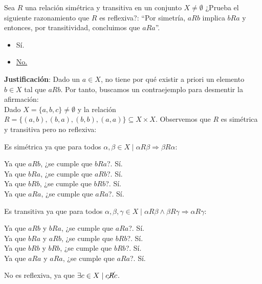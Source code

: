 \begin{ejercicio}
    Sea $R$ una relación simétrica y transitiva en un conjunto $X \neq \emptyset$ ¿Prueba el siguiente razonamiento que $R$ es reflexiva?:\newline
    ``Por simetría, $aRb$ implica $bRa$ y entonces, por transitividad, concluimos que $aRa$''.
    \begin{itemize}
        \item Sí.
        \item \underline{No.}
    \end{itemize}

    \noindent
    \textbf{Justificación}:
    Dado un $a \in X$, no tiene por qué existir a priori un elemento $b \in X$ tal que $aRb$. Por tanto, buscamos un contraejemplo para desmentir la afirmación:\\

    \noindent
    Dado $X = \{ a,b,c \} \neq \emptyset$ y la relación $R = \{ (a,b), (b,a), (b,b),(a,a) \} \subseteq X \times X$. \newline Observemos que $R$ es simétrica y transitiva pero no reflexiva:

    \noindent
    Es simétrica ya que para todos $\alpha, \beta \in X \mid \alpha R \beta \Rightarrow \beta R \alpha$:
    \begin{center}
        Ya que $aRb$, ¿se cumple que $bRa$?. Sí.\\
        Ya que $bRa$, ¿se cumple que $aRb$?. Sí.\\
        Ya que $bRb$, ¿se cumple que $bRb$?. Sí.\\
        Ya que $aRa$, ¿se cumple que $aRa$?. Sí.
    \end{center}
    Es transitiva ya que para todos $\alpha, \beta, \gamma \in X \mid \alpha R \beta \land \beta R \gamma \Rightarrow \alpha R \gamma$:
    \begin{center}
        Ya que $aRb$ y $bRa$, ¿se cumple que $aRa$?. Sí.\\
        Ya que $bRa$ y $aRb$, ¿se cumple que $bRb$?. Sí.\\
        Ya que $bRb$ y $bRb$, ¿se cumple que $bRb$?. Sí.\\
        Ya que $aRa$ y $aRa$, ¿se cumple que $aRa$?. Sí.
    \end{center}
    No es reflexiva, ya que $\exists c \in X \mid c\cancel{R}c$.
\end{ejercicio}

\newpage
\resetearcontador

